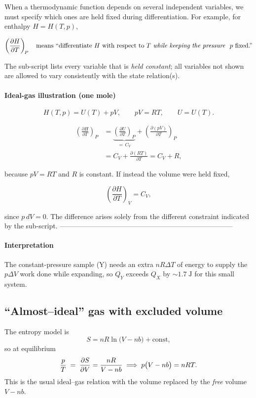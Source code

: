 \documentclass[12pt]{article}
\theoremstyle{definition} %
\theoremstyle{plain} %
\begin{document}
When a thermodynamic function depends on several independent variables,
we must specify which ones are held fixed during differentiation.
For example, for enthalpy \(H=H(T,p)\),

\[
  \left(\frac{\partial H}{\partial T}\right)_{\!P}
  \quad\text{means “differentiate }H\text{ with respect to }T
            \text{ \emph{while keeping the pressure } }p \text{ fixed.”}
\]

The sub-script lists every variable that is \emph{held constant}; all
variables not shown are allowed to vary consistently with the state
relation(s).

\bigskip
\paragraph{Ideal-gas illustration (one mole)}
\[
  H(T,p)=U(T)+pV,
  \qquad pV = RT,
  \qquad U=U(T).
\]

\[
\begin{aligned}
\left(\frac{\partial H}{\partial T}\right)_{\!P}
 &= \underbrace{\left(\frac{\partial U}{\partial T}\right)_{P}}_{=\,C_V}
    +\left(\frac{\partial (pV)}{\partial T}\right)_{P} \\[6pt]
 &= C_V + \frac{\partial (RT)}{\partial T}
  = C_V + R,
\end{aligned}
\]

because \(pV=RT\) and \(R\) is constant.  
If instead the volume were held fixed,

\[
  \left(\frac{\partial H}{\partial T}\right)_{V}=C_V,
\]

since \(p\,dV=0\).  The difference arises solely from the different
constraint indicated by the sub-script.
---------------------------------------------------------------------------
\paragraph{Interpretation}
The constant-pressure sample (Y) needs an extra \(nR\Delta T\) of energy to
supply the \(p\Delta V\) work done while expanding, so \(Q_Y\) exceeds \(Q_X\)
by \(\sim1.7\;\text{J}\) for this small system.
\subsection*{“Almost–ideal” gas with excluded volume}

The entropy model is
\[
  S = nR\ln\!\bigl(V - nb\bigr)+\text{const},
\]
so at equilibrium
\[
  \frac{p}{T} \;=\;
  \pdv{S}{V} = \frac{nR}{V-nb}
  \;\Longrightarrow\;
  p\bigl(V-nb\bigr)=nRT.
\]
This is the usual ideal–gas relation with the volume replaced by the
\emph{free} volume \(V-nb\).
\end{document}
